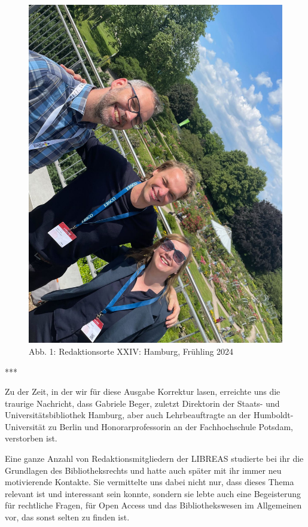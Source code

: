 \documentclass[a4paper,
fontsize=11pt,
oneside,
numbers=noperiodatend,
parskip=half-,
bibliography=totoc,
final
]{scrartcl}
\begin{document}
\begin{figure}[h!]
\centering
\includegraphics{image.jpg}
\caption{Abb. 1: Redaktionsorte XXIV: Hamburg, Frühling 2024}
\end{figure}

***

Zu der Zeit, in der wir für diese Ausgabe Korrektur lasen, erreichte uns
die traurige Nachricht, dass Gabriele Beger, zuletzt Direktorin der
Staats- und Universitätsbibliothek Hamburg, aber auch Lehrbeauftragte an
der Humboldt-Universität zu Berlin und Honorarprofessorin an der
Fachhochschule Potsdam, verstorben ist.

Eine ganze Anzahl von Redaktionsmitgliedern der LIBREAS studierte bei
ihr die Grundlagen des Bibliotheksrechts und hatte auch später mit ihr
immer neu motivierende Kontakte. Sie vermittelte uns dabei nicht nur,
dass dieses Thema relevant ist und interessant sein konnte, sondern sie
lebte auch eine Begeisterung für rechtliche Fragen, für Open Access und
das Bibliothekswesen im Allgemeinen vor, das sonst selten zu finden ist.
\end{document}
